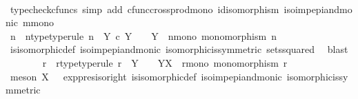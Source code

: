 \begin{isabellebody}
\ \ \ \ \ \ \ \ \isamarkupfalse%
\ {\isacharparenleft}{\kern0pt}typecheck{\isacharunderscore}{\kern0pt}cfuncs{\isacharcomma}{\kern0pt}\ simp\ add{\isacharcolon}{\kern0pt}\ cfunc{\isacharunderscore}{\kern0pt}cross{\isacharunderscore}{\kern0pt}prod{\isacharunderscore}{\kern0pt}mono\ id{\isacharunderscore}{\kern0pt}isomorphism\ iso{\isacharunderscore}{\kern0pt}imp{\isacharunderscore}{\kern0pt}epi{\isacharunderscore}{\kern0pt}and{\isacharunderscore}{\kern0pt}monic\ m{\isacharunderscore}{\kern0pt}mono{\isacharparenright}{\kern0pt}\ \ \isanewline
\ \ \ \ \ \ \isamarkupfalse%
\ n\ \ n{\isacharunderscore}{\kern0pt}type{\isacharbrackleft}{\kern0pt}type{\isacharunderscore}{\kern0pt}rule{\isacharbrackright}{\kern0pt}{\isacharcolon}{\kern0pt}\ {\isachardoublequoteopen}n\ {\isacharcolon}{\kern0pt}\ Y\ {\isasymtimes}\isactrlsub c\ Y\ \ {\isasymrightarrow}\ \ Y\isactrlbsup {\isasymOmega}\isactrlesup {\isachardoublequoteclose}\ \ n{\isacharunderscore}{\kern0pt}mono{\isacharcolon}{\kern0pt}\ {\isachardoublequoteopen}monomorphism\ n{\isachardoublequoteclose}\isanewline
\ \ \ \ \ \ \ \ \isamarkupfalse%
\ is{\isacharunderscore}{\kern0pt}isomorphic{\isacharunderscore}{\kern0pt}def\ iso{\isacharunderscore}{\kern0pt}imp{\isacharunderscore}{\kern0pt}epi{\isacharunderscore}{\kern0pt}and{\isacharunderscore}{\kern0pt}monic\ isomorphic{\isacharunderscore}{\kern0pt}is{\isacharunderscore}{\kern0pt}symmetric\ sets{\isacharunderscore}{\kern0pt}squared\ \isamarkupfalse%
\ blast\isanewline
\ \ \ \ \ \ \isamarkupfalse%
\ r\ \ r{\isacharunderscore}{\kern0pt}type{\isacharbrackleft}{\kern0pt}type{\isacharunderscore}{\kern0pt}rule{\isacharbrackright}{\kern0pt}{\isacharcolon}{\kern0pt}\ {\isachardoublequoteopen}r\ {\isacharcolon}{\kern0pt}\ Y\isactrlbsup {\isasymOmega}\isactrlesup \ \ {\isasymrightarrow}\ \ Y\isactrlbsup X\isactrlesup {\isachardoublequoteclose}\ \ r{\isacharunderscore}{\kern0pt}mono{\isacharcolon}{\kern0pt}\ {\isachardoublequoteopen}monomorphism\ r{\isachardoublequoteclose}\isanewline
\ \ \ \ \ \ \ \ \isamarkupfalse%
\ {\isacharparenleft}{\kern0pt}meson\ {\isacartoucheopen}X\ {\isasymcong}\ {\isasymOmega}{\isacartoucheclose}\ exp{\isacharunderscore}{\kern0pt}pres{\isacharunderscore}{\kern0pt}iso{\isacharunderscore}{\kern0pt}right\ is{\isacharunderscore}{\kern0pt}isomorphic{\isacharunderscore}{\kern0pt}def\ iso{\isacharunderscore}{\kern0pt}imp{\isacharunderscore}{\kern0pt}epi{\isacharunderscore}{\kern0pt}and{\isacharunderscore}{\kern0pt}monic\ isomorphic{\isacharunderscore}{\kern0pt}is{\isacharunderscore}{\kern0pt}symmetric{\isacharparenright}{\kern0pt}\isanewline

\end{isabellebody}
